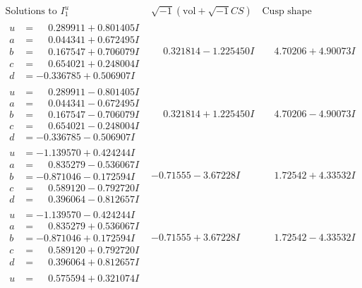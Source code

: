 \documentclass[1p]{elsarticle_modified}
\theoremstyle{definition}
\newcommand{\I}{\sqrt{-1}}
\begin{document}
$$\begin{array}{c|c|c}  
\text{Solutions to }I^u_{1}& \I (\text{vol} + \sqrt{-1}CS) & \text{Cusp shape}\\
 \hline 
\begin{aligned}
u &= \phantom{-}0.289911 + 0.801405 I \\
a &= \phantom{-}0.044341 + 0.672495 I \\
b &= \phantom{-}0.167547 + 0.706079 I \\
c &= \phantom{-}0.654021 + 0.248004 I \\
d &= -0.336785 + 0.506907 I\end{aligned}
 & \phantom{-}0.321814 - 1.225450 I & \phantom{-}4.70206 + 4.90073 I \\ \hline\begin{aligned}
u &= \phantom{-}0.289911 - 0.801405 I \\
a &= \phantom{-}0.044341 - 0.672495 I \\
b &= \phantom{-}0.167547 - 0.706079 I \\
c &= \phantom{-}0.654021 - 0.248004 I \\
d &= -0.336785 - 0.506907 I\end{aligned}
 & \phantom{-}0.321814 + 1.225450 I & \phantom{-}4.70206 - 4.90073 I \\ \hline\begin{aligned}
u &= -1.139570 + 0.424244 I \\
a &= \phantom{-}0.835279 - 0.536067 I \\
b &= -0.871046 - 0.172594 I \\
c &= \phantom{-}0.589120 - 0.792720 I \\
d &= \phantom{-}0.396064 - 0.812657 I\end{aligned}
 & -0.71555 - 3.67228 I & \phantom{-}1.72542 + 4.33532 I \\ \hline\begin{aligned}
u &= -1.139570 - 0.424244 I \\
a &= \phantom{-}0.835279 + 0.536067 I \\
b &= -0.871046 + 0.172594 I \\
c &= \phantom{-}0.589120 + 0.792720 I \\
d &= \phantom{-}0.396064 + 0.812657 I\end{aligned}
 & -0.71555 + 3.67228 I & \phantom{-}1.72542 - 4.33532 I \\ \hline\begin{aligned}
u &= \phantom{-}0.575594 + 0.321074 I \\

\end{aligned}
\end{array}$$
\end{document}
